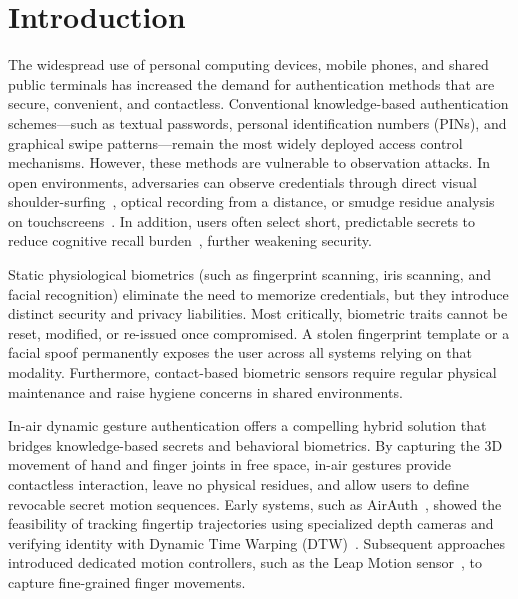 \documentclass[conference]{IEEEtran}
\begin{document}
\section{Introduction}

The widespread use of personal computing devices, mobile phones, and shared public terminals has increased the demand for authentication methods that are secure, convenient, and contactless. Conventional knowledge-based authentication schemes---such as textual passwords, personal identification numbers (PINs), and graphical swipe patterns---remain the most widely deployed access control mechanisms. However, these methods are vulnerable to observation attacks. In open environments, adversaries can observe credentials through direct visual shoulder-surfing~\cite{tari2006}, optical recording from a distance, or smudge residue analysis on touchscreens~\cite{aviv2010}. In addition, users often select short, predictable secrets to reduce cognitive recall burden~\cite{vonzezschwitz2013}, further weakening security.

Static physiological biometrics (such as fingerprint scanning, iris scanning, and facial recognition) eliminate the need to memorize credentials, but they introduce distinct security and privacy liabilities. Most critically, biometric traits cannot be reset, modified, or re-issued once compromised. A stolen fingerprint template or a facial spoof permanently exposes the user across all systems relying on that modality. Furthermore, contact-based biometric sensors require regular physical maintenance and raise hygiene concerns in shared environments.

In-air dynamic gesture authentication offers a compelling hybrid solution that bridges knowledge-based secrets and behavioral biometrics. By capturing the 3D movement of hand and finger joints in free space, in-air gestures provide contactless interaction, leave no physical residues, and allow users to define revocable secret motion sequences. Early systems, such as AirAuth~\cite{airauth}, showed the feasibility of tracking fingertip trajectories using specialized depth cameras and verifying identity with Dynamic Time Warping (DTW)~\cite{sakoe1978}. Subsequent approaches introduced dedicated motion controllers, such as the Leap Motion sensor~\cite{leappassword,dtwknn,inairsig}, to capture fine-grained finger movements.
\end{document}

